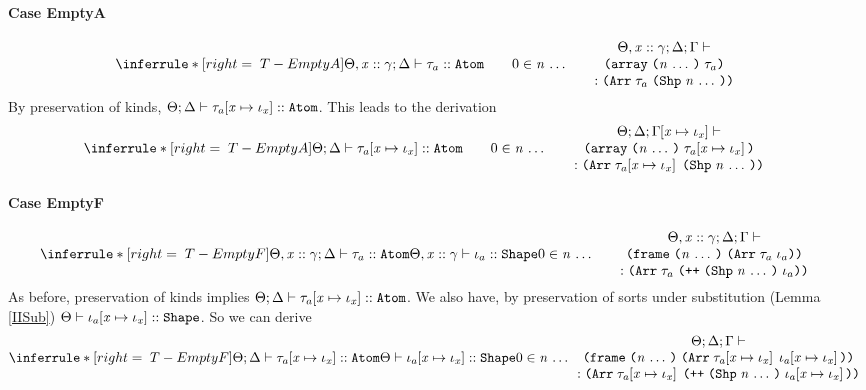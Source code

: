 \begin{sproof}
  \paragraph{Case {\sc EmptyA}}
  \[{\infr[T-EmptyA]
    {\kindof{\sEnv, \hassort{\var}{\sort}}{\kEnv}{\type_a}{\kindatom}
      \qquad 0 \in \sequence{\nat}}
    {\parbox{0.4\textwidth}
      {\centering
        \({\sEnv, \hassort{\var}{\sort}};{\kEnv};{\tEnv}\vdash\)
        \({\emptyarrlit{\type_a}{\sequence{\nat}}}\)
        \(:{\typearray{\type_a}{\idxshape{\sequence{\nat}}}}\)}}}\]
  By preservation of kinds,
  $\Theta;\Delta \vdash \mathit{\tau}_a\hspace{-2pt}\left[ \mathit{x} \mapsto \mathit{\iota}_{\mathit{x}} \right] :: \text{\tt Atom}$.
  This leads to the derivation
  \[{\infr[T-EmptyA]
    {\kindof{\sEnv}{\kEnv}{\idxsubst{\type_a}}{\kindatom}
      \qquad 0 \in \sequence{\nat}}
    {\parbox{0.51\textwidth}
      {\centering
        \({\sEnv};{\kEnv};{\idxsubst{\tEnv}}\vdash\)
        \({\emptyarrlit{\idxsubst{\type_a}}{\sequence{\nat}}}\)
        \(:{\typearray{\idxsubst{\type_a}}{\idxshape{\sequence{\nat}}}}\)}}}\]
  \paragraph{Case {\sc EmptyF}}
  \[{\infr[T-EmptyF]
    {\kindof{\sEnv, \hassort{\var}{\sort}}{\kEnv}{\type_a}{\kindatom}
      \\\\
      \sortof{\sEnv, \hassort{\var}{\sort}}{\idx_a}{\sortshp}
      \\ 0 \in \sequence{\nat}}
    {\parbox{0.5\textwidth}
      {\centering
        \({\sEnv, \hassort{\var}{\sort}};{\kEnv};{\tEnv}\vdash\)
        \({\emptyfrm{\typearray{\type_a}{\idx_a}}{\sequence{\nat}}}\)
        \(:{\typearray
          {\type_a}
          {\idxappend{\idxshape{\sequence{\nat}} \; \idx_a}}}\)}}}\]
  As before, preservation of kinds implies
  $\Theta;\Delta \vdash \mathit{\tau}_a\hspace{-2pt}\left[ \mathit{x} \mapsto \mathit{\iota}_{\mathit{x}} \right] :: \text{\tt Atom}$.
  We also have, by preservation of sorts under substitution (Lemma \ref{IISub})
  $\Theta \vdash \mathit{\iota}_a\hspace{-2pt}\left[ \mathit{x} \mapsto \mathit{\iota}_{\mathit{x}} \right] :: \text{\tt Shape}$.
  So we can derive
  \[{\infr[T-EmptyF]
    {\kindof{\sEnv}{\kEnv}{\idxsubst{\type_a}}{\kindatom}
      \\\\
      \sortof{\sEnv}{\idxsubst{\idx_a}}{\sortshp}
      \\ 0 \in \sequence{\nat}}
    {\parbox{0.63\textwidth}
      {\centering
        \({\sEnv};{\kEnv};{\tEnv}\vdash\)
        \({\emptyfrm
          {\typearray{\idxsubst{\type_a}}{\idxsubst{\idx_a}}}
          {\sequence{\nat}}}\)
        \(:{\typearray
          {\idxsubst{\type_a}}
          {\idxappend{\idxshape{\sequence{\nat}} \; \idxsubst{\idx_a}}}}\)}}}\]

\end{sproof}
